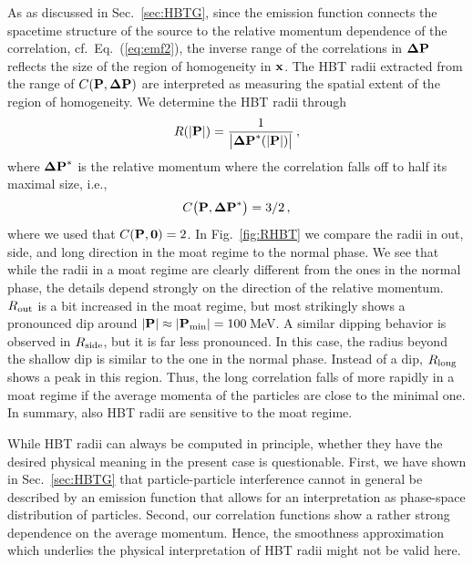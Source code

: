 \documentclass[reprint,superscriptaddress,english,preprintnumbers,amsmath,amssymb,aps,prx]{revtex4-2}
\def\Eq#1{Eq.~(\ref{#1})}
\def\Fig#1{Fig.~\ref{#1}}
\def\Sec#1{Sec.~\ref{#1}}
\begin{document}
As as discussed in \Sec{sec:HBTG}, since the emission function connects the spacetime structure of the source to the relative momentum dependence of the correlation, cf.\ \Eq{eq:emf2}, the inverse range of the correlations in $\bold{\Delta P}$ reflects the size of the region of homogeneity in $\bold{x}$. The HBT radii extracted from the range of $C(\bold{P},\bold{\Delta P})$ are interpreted as measuring the spatial extent of the region of homogeneity. We determine the HBT radii through
\begin{align}
R(|\bold{P}|) = \frac{1}{\big|\bold{\Delta P}^*(|\bold{P}|)\big|}\,,
\end{align}
where $\bold{\Delta P}^*$ is the relative momentum where the correlation falls off to half its maximal size, i.e.,
\begin{align}
C\big(\bold{P},\bold{\Delta P}^*\big)=3/2\,,
\end{align}
where we used that $C(\bold{P},\bold{0})=2$.
In \Fig{fig:RHBT} we compare the radii in out, side, and long direction in the moat regime to the normal phase. We see that while the radii in a moat regime are clearly different from the ones in the normal phase, the details depend strongly on the direction of the relative momentum. 
 $R_{\rm out}$ is a bit increased in the moat regime, but most strikingly shows a pronounced dip around $|\bold{P}| \approx |\bold{P}_{\rm min}| = 100$\,MeV. A similar dipping behavior is observed in $R_{\rm side}$, but it is far less pronounced. In this case, the radius beyond the shallow dip is similar to the one in the normal phase. Instead of a dip, $R_{\rm long}$ shows a peak in this region. Thus, the long correlation falls of more rapidly in a moat regime if the average momenta of the particles are close to the minimal one. In summary, also HBT radii are sensitive to the moat regime.

While HBT radii can always be computed in principle, whether they have the desired physical meaning in the present case is questionable. First, we have shown in \Sec{sec:HBTG} that particle-particle interference cannot in general be described by an emission function that allows for an interpretation as phase-space distribution of particles. Second, our correlation functions show a rather strong dependence on the average momentum. Hence, the smoothness approximation which underlies the physical interpretation of HBT radii \cite{Pratt:1997pw} might not be valid here. 

\end{document}
